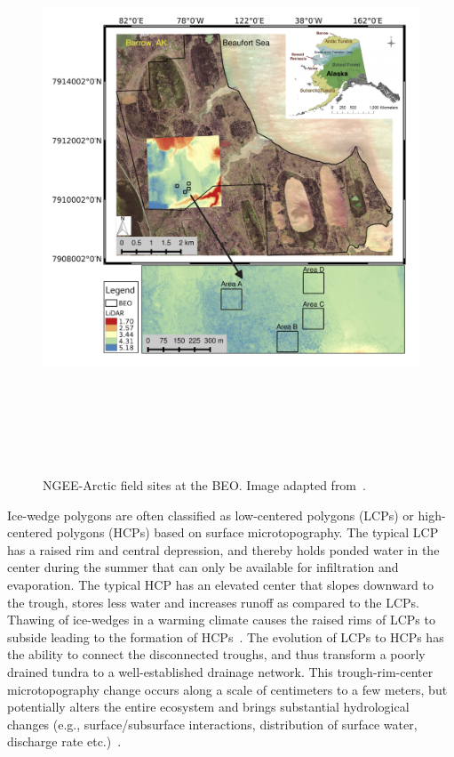 \begin{figure}[!h]
\centering
 \includegraphics[width=14cm, height=17cm]{./figures/ngee-arctic-fieldsites.png}
\caption{NGEE-Arctic field sites at the BEO. Image adapted from~\citet{kumar2016modeling}.}
\label{ngee-arctic-fieldsites}
\end{figure}
%

Ice-wedge polygons are often classified as low-centered polygons (LCPs) or high-centered polygons (HCPs) based on surface microtopography.
The typical LCP has a raised rim and central depression, and thereby holds ponded water in the center during the summer that can only be available for infiltration and evaporation.
The typical HCP has an elevated center that slopes downward to the trough, stores less water and increases runoff as compared to the LCPs. 
Thawing of ice-wedges in a warming climate causes the raised rims of LCPs to subside leading to the formation of HCPs~\citet{jorgenson2006abrupt}.
The evolution of LCPs to HCPs has the ability to connect the disconnected troughs, and thus transform a poorly drained tundra to a well-established drainage network.
This trough-rim-center microtopography change occurs along a scale of centimeters to a few meters, but potentially alters the entire ecosystem and brings substantial hydrological changes (e.g., surface/subsurface interactions, distribution of surface water, discharge rate etc.)~\citet{liljedahl2016pan, hinzman2005evidence,rowland2010arctic,liljedahl2012ice}.

